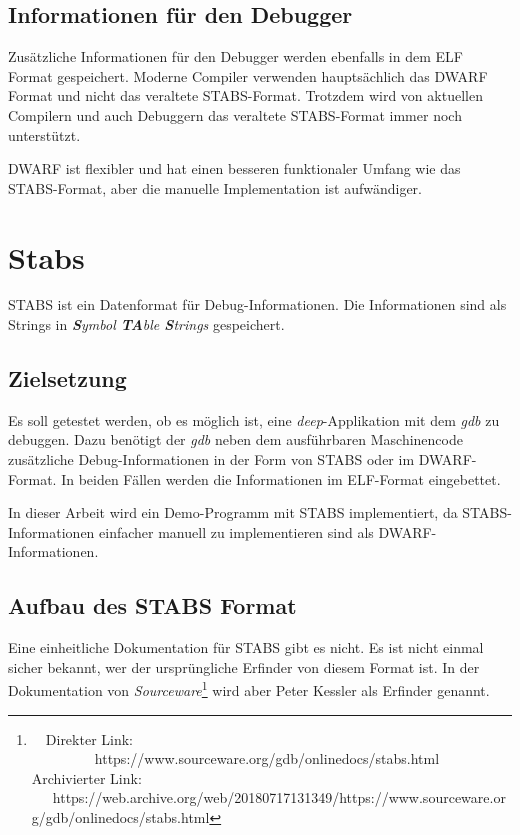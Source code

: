 \subsection{Informationen für den Debugger}
Zusätzliche Informationen für den Debugger werden ebenfalls in dem ELF Format gespeichert.
Moderne Compiler verwenden hauptsächlich das DWARF Format und nicht das veraltete STABS-Format.
Trotzdem wird von aktuellen Compilern und auch Debuggern das veraltete STABS-Format immer noch unterstützt.

DWARF ist flexibler und hat einen besseren funktionaler Umfang wie das STABS-Format, aber die manuelle Implementation ist aufwändiger.





\section{Stabs}
\label{label:stabs}
STABS ist ein Datenformat für Debug-Informationen.
Die Informationen sind als Strings in \textit{\textbf{S}ymbol \textbf{TA}ble \textbf{S}trings} gespeichert.

\subsection{Zielsetzung}
Es soll getestet werden, ob es möglich ist, eine \textit{deep}-Applikation mit dem \textit{gdb} zu debuggen.
Dazu benötigt der \textit{gdb} neben dem ausführbaren Maschinencode zusätzliche Debug-Informationen in der Form von STABS oder im DWARF-Format.
In beiden Fällen werden die Informationen im ELF-Format eingebettet.

In dieser Arbeit wird ein Demo-Programm mit STABS implementiert, da STABS-Informationen einfacher manuell zu implementieren sind als DWARF-Informationen.


\subsection{Aufbau des STABS Format}
Eine einheitliche Dokumentation für STABS gibt es nicht.
Es ist nicht einmal sicher bekannt, wer der ursprüngliche Erfinder von diesem Format ist.
In der Dokumentation von \textit{Sourceware}\footnote{\ \ Direkter Link: \ \ \ \ \ \ \ \ \ https://www.sourceware.org/gdb/onlinedocs/stabs.html\\ Archivierter Link: \ \ \ https://web.archive.org/web/20180717131349/https://www.sourceware.org/gdb/onlinedocs/stabs.html} wird aber Peter Kessler als Erfinder genannt.

